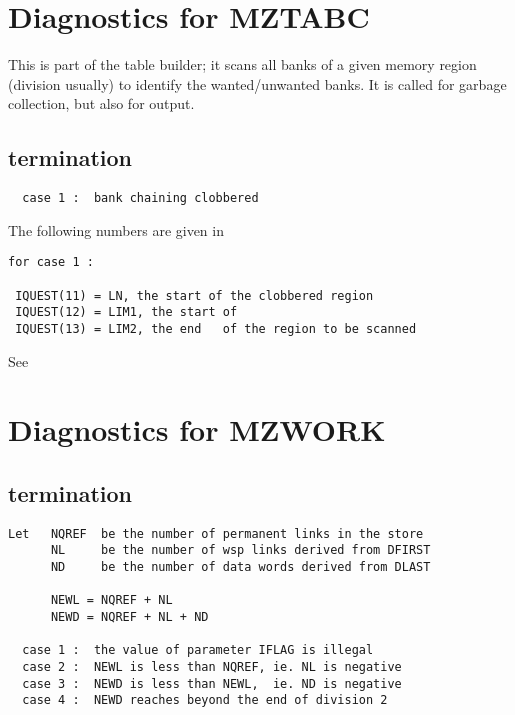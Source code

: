 \section{Diagnostics for MZTABC}


This is part of the table builder;
it scans all banks of a given memory region (division usually)
to identify the wanted/unwanted banks.
It is called for garbage collection, but also for output.

\subsection*{ termination}

\begin{verbatim}
  case 1 :  bank chaining clobbered
\end{verbatim}

The following numbers are given in 

\begin{verbatim}
for case 1 :

 IQUEST(11) = LN, the start of the clobbered region
 IQUEST(12) = LIM1, the start of
 IQUEST(13) = LIM2, the end   of the region to be scanned
\end{verbatim}


See 

\section{Diagnostics for MZWORK}


\subsection*{ termination}

\begin{verbatim}
Let   NQREF  be the number of permanent links in the store
      NL     be the number of wsp links derived from DFIRST
      ND     be the number of data words derived from DLAST

      NEWL = NQREF + NL
      NEWD = NQREF + NL + ND

  case 1 :  the value of parameter IFLAG is illegal
  case 2 :  NEWL is less than NQREF, ie. NL is negative
  case 3 :  NEWD is less than NEWL,  ie. ND is negative
  case 4 :  NEWD reaches beyond the end of division 2
\end{verbatim}

